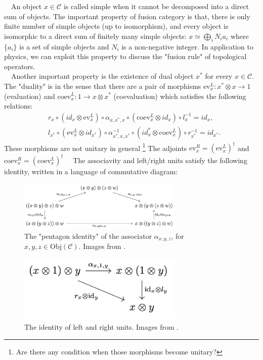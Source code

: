 \documentclass{ltjsarticle}
\theoremstyle{mystyle} %
\numberwithin{equation}{section}
\begin{document}
　An object $x\in \mathcal{C}$ is called simple when it cannot be decomposed into a direct sum of objects. 
The important property of fusion category is that, 
there is only finite number of simple objects (up to isomorphism), and 
every object is isomorphic to a direct sum of finitely many simple objects: 
$x\simeq \bigoplus_{i}N_i a_i$ where $\{a_i\}$ is a set of simple objects and $N_i$ is a non-negative integer. 
In application to physics, we can exploit this property to discuss the "fusion rule" of topological operators. \\
　Another important property is the existence of dual object $x^*$ for every $x\in \mathcal{C}$. 
The "duality" is in the sense that there are a pair of morphisms 
$\mathrm{ev}^{L}_x: x^*\otimes x \to 1$ (evaluation) and $\mathrm{coev}^{L}_x: 1\to x\otimes x^*$ (coevaluation) which satisfies the following relations: 
\begin{align}
    &r_x\circ (id_x\otimes \mathrm{ev}^L_x)\circ \alpha_{x, x^*, x}\circ (\mathrm{coev}^L_x\otimes id_x)\circ l^{-1}_x = id_x, \\
    &l_{x^*}\circ(\mathrm{ev}^L_x\otimes id_{x^{*}}) \circ \alpha^{-1}_{x^*, x, x^*}\circ (id_x^*\otimes \mathrm{coev}^{L}_x)\circ r^{-1}_{x^*}=id_{x^*}. 
    \label{eval}
\end{align}
These morphisms are not unitary in general
\footnote{Are there any condition when those morphisms become unitary? }
The adjoints $\mathrm{ev}^R_x = (\mathrm{ev}^{L}_x)^\dagger$ and $\mathrm{coev}^{R}_x = (\mathrm{coev}^{L}_x)^\dagger$ 
　The associavity and left/right units satisfy the following identity, written in a language of commutative diagram: 
\begin{figure}[H]
    \centering
    \includegraphics[width=0.7\textwidth]{pentagon.png}
    \caption{The "pentagon identity" of the associator $\alpha_{x,y,z}$, for $x,y,z\in \mathrm{Obj}(\mathcal{C})$. 
    Images from \cite{KI}. }
    \label{pentagon}
\end{figure}
\begin{figure}[H]
    \centering
    \includegraphics[width=0.7\textwidth]{lrunits.png}
    \caption{The identity of left and right units. 
    Images from \cite{KI}. }
    \label{lrunits}
\end{figure}
\end{document}
